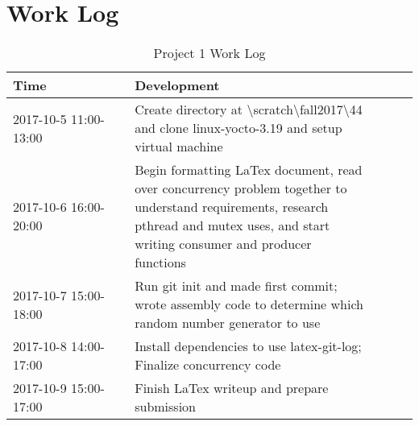 \documentclass[letterpaper,10pt]{article}
\begin{document}
\newpage
\section{Work Log}

\begin{table}[h]
\centering
\caption{Project 1 Work Log}
\begin{tabular}{| p{0.3\linewidth}| p{0.6\linewidth} | p{0.3\linewidth} |}
\hline Time & Development \\
\hline 2017-10-5 11:00-13:00   & Create directory at \textbackslash scratch\textbackslash fall2017\textbackslash 44 and clone linux-yocto-3.19 and setup virtual machine \\
\hline 2017-10-6 16:00-20:00   & Begin formatting LaTex document, read over concurrency problem together to understand requirements, research pthread and mutex uses, and start writing consumer and producer functions     \\
\hline 2017-10-7 15:00-18:00   & Run git init and made first commit; wrote assembly code to determine which random number generator to use      \\
\hline 2017-10-8 14:00-17:00   & Install dependencies to use latex-git-log; Finalize concurrency code    \\
\hline 2017-10-9 15:00-17:00   & Finish LaTex writeup and prepare submission    \\
\hline 
\end{tabular}
\end{table}


%
\end{document}
